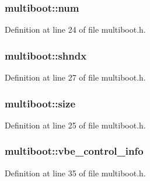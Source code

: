 \subsubsection[{\texorpdfstring{num}{num}}]{ multiboot\+::num}\hypertarget{structmultiboot_a3ac1437ae93564fce66f26fc4263d8ac}{}\label{structmultiboot_a3ac1437ae93564fce66f26fc4263d8ac}


Definition at line 24 of file multiboot.\+h.

\subsubsection[{\texorpdfstring{shndx}{shndx}}]{ multiboot\+::shndx}\hypertarget{structmultiboot_ac2da230048a20331b735182dddb67cf7}{}\label{structmultiboot_ac2da230048a20331b735182dddb67cf7}


Definition at line 27 of file multiboot.\+h.

\subsubsection[{\texorpdfstring{size}{size}}]{ multiboot\+::size}\hypertarget{structmultiboot_a425167758dbbf33818af5cc6c46c8a62}{}\label{structmultiboot_a425167758dbbf33818af5cc6c46c8a62}


Definition at line 25 of file multiboot.\+h.

\subsubsection[{\texorpdfstring{vbe\+\_\+control\+\_\+info}{vbe_control_info}}]{ multiboot\+::vbe\+\_\+control\+\_\+info}\hypertarget{structmultiboot_a4feb8a09c538448a72b5a704e3bfed80}{}\label{structmultiboot_a4feb8a09c538448a72b5a704e3bfed80}


Definition at line 35 of file multiboot.\+h.

